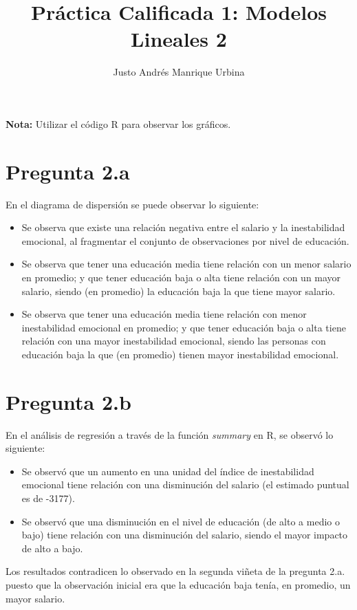 \documentclass{article}
\title{Práctica Calificada 1: Modelos Lineales 2}
\author{Justo Andrés Manrique Urbina}
\begin{document}
\maketitle
\textbf{Nota: } Utilizar el código R para observar los gráficos.
\section{Pregunta 2.a}

En el diagrama de dispersión se puede observar lo siguiente:
\begin{itemize}
	\item Se observa que existe una relación negativa entre el salario y la inestabilidad emocional, al fragmentar el conjunto de observaciones por nivel de educación.
	\item Se observa que tener una educación media tiene relación con un menor salario en promedio; y que tener educación baja o alta tiene relación con un mayor salario, siendo (en promedio) la educación baja la que tiene mayor salario.
	\item Se observa que tener una educación media tiene relación con menor inestabilidad emocional en promedio; y que tener educación baja o alta tiene relación con una mayor inestabilidad emocional, siendo las personas con educación baja la que (en promedio) tienen mayor inestabilidad emocional.
\end{itemize}

\section{Pregunta 2.b}

En el análisis de regresión a través de la función \textit{summary} en R, se observó lo siguiente:
\begin{itemize}
	\item Se observó que un aumento en una unidad del índice de inestabilidad emocional tiene relación con una disminución del salario (el estimado puntual es de -3177).
	\item Se observó que una disminución en el nivel de educación (de alto a medio o bajo) tiene relación con una disminución del salario, siendo el mayor impacto de alto a bajo.
\end{itemize}

Los resultados contradicen lo observado en la segunda viñeta de la pregunta 2.a. puesto que la observación inicial era que la educación baja tenía, en promedio, un mayor salario.
\end{document}
